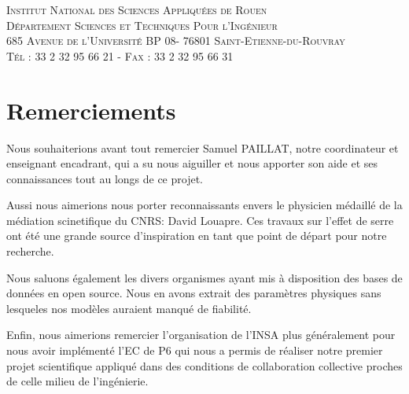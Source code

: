 \documentclass[a4paper, 12pt]{report} %
\begin{document}

\begin{center}
	\scshape Institut National des Sciences Appliquées de Rouen \\
	Département Sciences et Techniques Pour l'Ingénieur \\
	685 Avenue de l'Université BP 08- 76801 Saint-Etienne-du-Rouvray \\ Tél : 33 2 32 95 66 21 - Fax : 33 2 32 95 66 31
\end{center}


\newpage
\chapter*{Remerciements} %

\setlength{\parindent}{30pt}
Nous souhaiterions avant tout remercier Samuel PAILLAT, notre
coordinateur et enseignant encadrant, qui a su nous aiguiller
et nous apporter son aide et ses connaissances tout au longs
de ce projet. \vspace{\baselineskip}

\indent Aussi nous aimerions nous porter reconnaissants 
envers le physicien médaillé de la médiation scinetifique
du CNRS: David Louapre. Ces travaux sur l'effet de serre 
ont été une grande source d'inspiration en tant que point 
de départ pour notre recherche. \vspace{\baselineskip}

\indent Nous saluons également les divers organismes ayant 
mis à disposition des bases de données en open source. Nous
en avons extrait des paramètres physiques sans lesqueles 
nos modèles auraient manqué de fiabilité. \vspace{\baselineskip}

\indent Enfin, nous aimerions remercier l'organisation de 
l'INSA plus généralement pour nous avoir implémenté l'EC de P6
qui nous a permis de réaliser notre premier projet
scientifique appliqué dans des conditions de collaboration
collective proches de celle milieu de l'ingénierie. 
\vfill



\newpage
\pagestyle{courant} 
	\setcounter{tocdepth}{2} %
	\tableofcontents %
\end{document}
